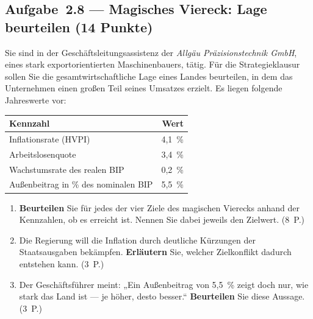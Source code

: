 \subsection*{Aufgabe~2.8 --- Magisches Viereck: Lage beurteilen (14 Punkte)}

Sie sind in der Geschäftsleitungsassistenz der \emph{Allgäu Präzisionstechnik GmbH}, eines
stark exportorientierten Maschinenbauers, tätig. Für die Strategieklausur sollen Sie die
gesamtwirtschaftliche Lage eines Landes beurteilen, in dem das Unternehmen einen großen
Teil seines Umsatzes erzielt. Es liegen folgende Jahreswerte vor:

\begin{center}
\begin{tabular}{l r}
\toprule
\rowcolor{bfwTabHead} \textbf{Kennzahl} & \textbf{Wert}\\
\midrule
Inflationsrate (HVPI) & 4,1~\%\\
Arbeitslosenquote & 3,4~\%\\
Wachstumsrate des realen BIP & 0,2~\%\\
Außenbeitrag in \% des nominalen BIP & 5,5~\%\\
\bottomrule
\end{tabular}
\end{center}

\begin{enumerate}[label=\alph*)]
  \item \textbf{Beurteilen} Sie für jedes der vier Ziele des magischen Vierecks anhand der
    Kennzahlen, ob es erreicht ist. Nennen Sie dabei jeweils den Zielwert. \hfill (8~P.)
  \item Die Regierung will die Inflation durch deutliche Kürzungen der Staatsausgaben
    bekämpfen. \textbf{Erläutern} Sie, welcher Zielkonflikt dadurch entstehen kann.
    \hfill (3~P.)
  \item Der Geschäftsführer meint: „Ein Außenbeitrag von 5,5~\% zeigt doch nur, wie stark
    das Land ist --- je höher, desto besser.`` \textbf{Beurteilen} Sie diese Aussage.
    \hfill (3~P.)
\end{enumerate}
